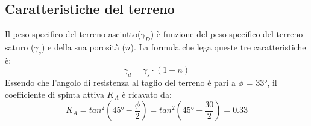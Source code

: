 \subsection{Caratteristiche del terreno}
Il peso specifico del terreno asciutto($\gamma_D$) è funzione del peso specifico del terreno saturo ($\gamma_s$) e della sua porosità ($n$). La formula che lega queste tre caratteristiche è:
\begin{equation*}
    \gamma_d = \gamma_s \cdot (1-n)
\end{equation*} 
Essendo che l'angolo di resistenza al taglio del terreno è pari a $\phi$ = 33°, il coefficiente di spinta attiva $K_A$ è ricavato da:
\begin{equation*}
    K_A = tan^2 \left(45° - \frac{\phi}{2}\right) = tan^2 \left(45° - \frac{30}{2}\right) = 0.33
\end{equation*}